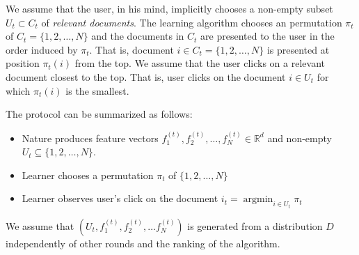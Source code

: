 \documentclass{article}
\newcommand{\R}{\mathbb{R}}
\DeclareMathOperator*{\argmin}{argmin}
\begin{document}
We assume that the user, in his mind, implicitly chooses a non-empty subset $U_t
\subset C_t$ of \emph{relevant documents}. The learning algorithm chooses an
permutation $\pi_t$ of $C_t = \{1,2,\dots,N\}$ and the documents in $C_t$ are
presented to the user in the order induced by $\pi_t$. That is, document $i \in
C_t = \{1,2,\dots,N\}$ is presented at position $\pi_t(i)$ from the top. We
assume that the user clicks on a relevant document closest to the top. That is,
user clicks on the document $i \in U_t$ for which $\pi_t(i)$ is the smallest.

The protocol can be summarized as follows:

\begin{itemize}
\item Nature produces feature vectors
$f^{(t)}_1, f^{(t)}_2, \dots, f^{(t)}_N \in \R^d$
and non-empty $U_t \subseteq \{1,2,\dots,N\}$.
\item Learner chooses a permutation $\pi_t$ of $\{1,2,\dots,N\}$
\item Learner observes user's click on the document $i_t = \argmin_{i \in U_t} \pi_t$
\end{itemize}

We assume that $(U_t, f_1^{(t)}, f_2^{(t)}, \dots f_N^{(t)})$ is generated from
a distribution $D$ independently of other rounds and the ranking of the
algorithm.
\end{document}
